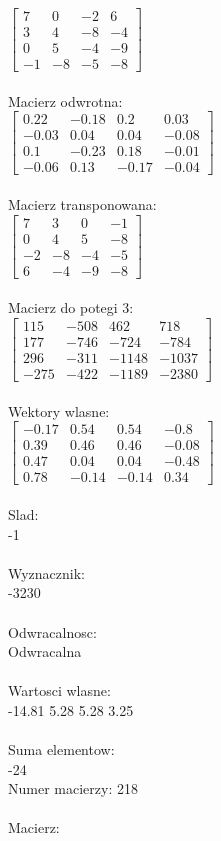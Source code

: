 \documentclass[a4paper,12pt]{article}
\begin{document}
$\begin{bmatrix} 7&0&-2&6\\3&4&-8&-4\\0&5&-4&-9\\-1&-8&-5&-8 \end{bmatrix}$
\\
\\
Macierz odwrotna:\\

$\begin{bmatrix} 0.22&-0.18&0.2&0.03\\-0.03&0.04&0.04&-0.08\\0.1&-0.23&0.18&-0.01\\-0.06&0.13&-0.17&-0.04 \end{bmatrix}$
\\
\\
Macierz transponowana:\\

$\begin{bmatrix} 7&3&0&-1\\0&4&5&-8\\-2&-8&-4&-5\\6&-4&-9&-8 \end{bmatrix}$
\\
\\
Macierz do potegi 3:\\

$\begin{bmatrix} 115&-508&462&718\\177&-746&-724&-784\\296&-311&-1148&-1037\\-275&-422&-1189&-2380 \end{bmatrix}$
\\
\\
Wektory wlasne:\\

$\begin{bmatrix} -0.17&0.54&0.54&-0.8\\0.39&0.46&0.46&-0.08\\0.47&0.04&0.04&-0.48\\0.78&-0.14&-0.14&0.34 \end{bmatrix}$
\\
\\
Slad:\\
-1
\\
\\
Wyznacznik:\\
-3230
\\
\\
Odwracalnosc:\\
Odwracalna
\\
\\
Wartosci wlasne:\\
-14.81 5.28 5.28 3.25
\\
\\
Suma elementow:\\
-24
\\
\newpage
Numer macierzy:
218
\\
\\
Macierz:\\
\end{document}
